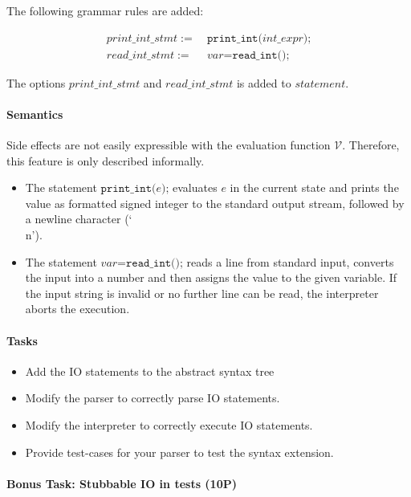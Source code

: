\documentclass{article}
\newcommand\inParens[1]{\texttt{(}#1\texttt{)}}
\newcommand\semicolon{\texttt{;}}
\begin{document}
The following grammar rules are added:


\begin{align}
print\_int\_stmt :=& \ \texttt{print\_int}\inParens{int\_expr}\semicolon \\
read\_int\_stmt :=& \ var \texttt{=}\texttt{read\_int}\inParens{}\semicolon
\end{align}


The options $print\_int\_stmt$ and $read\_int\_stmt$ is added to $statement$.

\paragraph{Semantics}

Side effects are not easily expressible with the evaluation function $\mathcal{V}$. Therefore, this feature is only described informally.

\begin{itemize}
\item The statement $\texttt{print\_int(}e\texttt{);}$ evaluates $e$ in the current state and prints the value as formatted signed integer to the standard output stream, followed by a newline character (`\\n').
\item The statement $var \texttt{=read\_int();}$ reads a line from standard input, converts the input into a number and then assigns the value to the given variable. If the input string is invalid or no further line can be read, the interpreter aborts the execution.
\end{itemize}

\paragraph{Tasks}

\begin{itemize}
\item Add the IO statements to the abstract syntax tree
\item Modify the parser to correctly parse IO statements.
\item Modify the interpreter to correctly execute IO statements.
\item Provide test-cases for your parser to test the syntax extension.
\end{itemize}

\paragraph{Bonus Task: Stubbable IO in tests (10P)}
\end{document}
